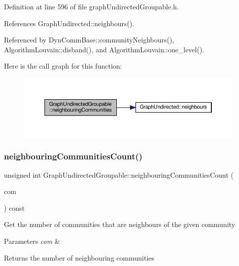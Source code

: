 Definition at line 596 of file graph\+Undirected\+Groupable.\+h.



References Graph\+Undirected\+::neighbours().



Referenced by Dyn\+Comm\+Base\+::community\+Neighbours(), Algorithm\+Louvain\+::disband(), and Algorithm\+Louvain\+::one\+\_\+level().

Here is the call graph for this function\+:
\nopagebreak
\begin{figure}[H]
\begin{center}
\leavevmode
\includegraphics[width=350pt]{classGraphUndirectedGroupable_a48823a0162b95a72c22d0ab01a709e1f_cgraph}
\end{center}
\end{figure}
\mbox{\label{classGraphUndirectedGroupable_aaf488071a0e3b6cf96b29ae1af8df02f}} 
\subsubsection{\texorpdfstring{neighbouring\+Communities\+Count()}{neighbouringCommunitiesCount()}}
{\footnotesize\ttfamily unsigned int Graph\+Undirected\+Groupable\+::neighbouring\+Communities\+Count (\begin{DoxyParamCaption}\item[{const \hyperlink{graphUndirectedGroupable_8h_a914da95c9ea7f14f4b7f875c36818556}{type\+Community} \&}]{com }\end{DoxyParamCaption}) const\hspace{0.3cm}{\ttfamily [inline]}}

Get the number of communities that are neighbours of the given community


\begin{DoxyParams}{Parameters}
{\em com} & \\
\hline
\end{DoxyParams}
\begin{DoxyReturn}{Returns}
the number of neighbouring communities 
\end{DoxyReturn}


